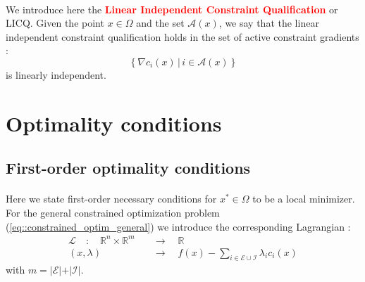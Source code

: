 \documentclass[a4paper]{article}
\begin{document}
{{			\paragraph{} We introduce here the \textbf{\textcolor{red}{Linear Independent Constraint Qualification}} or LICQ. Given the point $x\in\Omega$ and the set $\mathcal{A}(x)$, we say that the linear independent constraint qualification holds in the set of active constraint gradients : 
			\begin{equation}
				\left\{ \nabla c_i(x) \, \vert \, i \in\mathcal{A}(x) \right\} 
			\end{equation}
			is linearly independent. 
		}
	}
	\section{Optimality conditions}
	{
		\subsection{First-order optimality conditions}
		{
			\paragraph{} Here we state first-order necessary conditions for $x^*\in\Omega$ to be a local minimizer. For the general constrained optimization problem (\ref{eq::constrained_optim_general}) we introduce the corresponding Lagrangian : 
			\begin{equation}
				\begin{aligned}
					\mathcal{L} \quad : \quad \mathbb{R}^n \times \mathbb{R}^m \quad &\to \quad \mathbb{R}\\
					(x,\lambda) \quad &\to \quad f(x) - \sum_{i\in\mathcal{E}\cup \mathcal{I}} \lambda_i c_i(x) 
				\end{aligned}		
			\end{equation}
			with $m = \vert \mathcal{E} \vert + \vert \mathcal{I} \vert$. 
			
			\vspace{10pt}
			
}}
\end{document}
